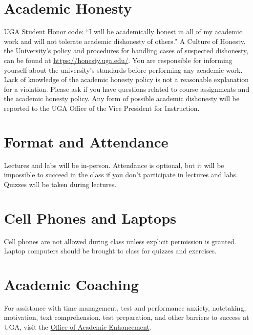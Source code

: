 \documentclass[12pt]{article}
\begin{document}
\vspace{-2mm}
\section*{\normalsize Academic Honesty}
\vspace{-4mm}

UGA Student Honor code: ``I will be academically honest in all of my
academic work and will not tolerate academic dishonesty of others.'' A
Culture of Honesty, the University's policy and procedures for
handling cases of suspected dishonesty, can be found at
\url{https://honesty.uga.edu/}. You are responsible for 
informing yourself about the university's standards before performing
any academic work. Lack of knowledge of the academic honesty policy is
not a reasonable explanation for a violation. Please ask if you have
questions related to course assignments and the academic honesty
policy. Any form of possible academic dishonesty will be reported to
the UGA Office of the Vice President for Instruction.

\clearpage


\section*{\normalsize Format and Attendance}
\vspace{-4mm}
Lectures and labs will be in-person. Attendance is optional, but it
will be impossible to succeed in the class if you don't participate in
lectures and labs. Quizzes will be taken during lectures. 

\vspace{-12pt}
\section*{\normalsize Cell Phones and Laptops}
\vspace{-4mm}
Cell phones are not allowed during class unless explicit permission is
granted. Laptop computers should be brought to class for quizzes and
exercises.


\vspace{-12pt}
\section*{\normalsize Academic Coaching}
\vspace{-4mm}

For assistance with time management, test and performance anxiety,
notetaking, motivation, text comprehension, test preparation, and
other barriers to success at UGA, visit the
\href{https://dae.uga.edu/services/academic-coaching/}{Office of Academic Enhancement}. 
\end{document}
